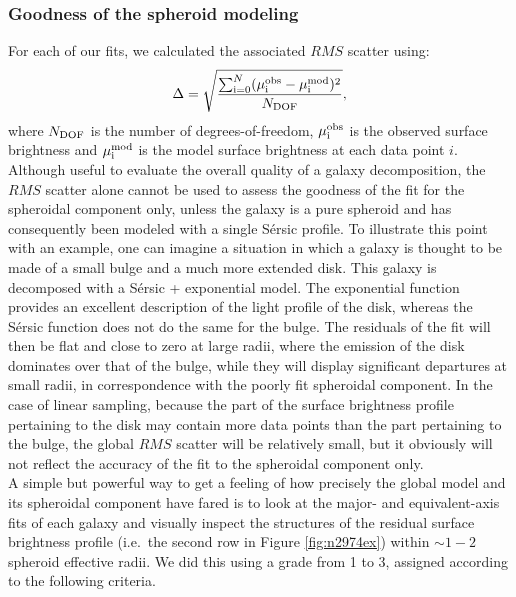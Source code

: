 \documentclass[preprint2]{emulateapj}
\begin{document}
\subsubsection{Goodness of the spheroid modeling}
For each of our fits, we calculated the associated $RMS$ scatter using:
\begin{equation}
\Delta = \sqrt{\frac{\sum_{\rm i=0}^{N} (\mu_{\rm i}^{\rm obs} - \mu_{\rm i}^{\rm mod})^2}{N_{\rm DOF}} } ,
\end{equation} 
where $N_{\rm DOF}$ is the number of degrees-of-freedom, 
$\mu_{\rm i}^{\rm obs}$ is the observed surface brightness 
and $\mu_{\rm i}^{\rm mod}$ is the model surface brightness at each data point $i$.
Although useful to evaluate the overall quality of a galaxy decomposition, 
the $RMS$ scatter alone cannot be used to assess the goodness of the fit for the spheroidal component only, 
unless the galaxy is a pure spheroid and has consequently been modeled with a single S\'ersic profile.
To illustrate this point with an example, 
one can imagine a situation in which a galaxy is thought to be made of a small bulge and a much more extended disk.
This galaxy is decomposed with a S\'ersic + exponential model.
The exponential function provides an excellent description of the light profile of the disk, 
whereas the S\'ersic function does not do the same for the bulge.
The residuals of the fit will then be flat and close to zero at large radii, 
where the emission of the disk dominates over that of the bulge,
while they will display significant departures at small radii, 
in correspondence with the poorly fit spheroidal component.
In the case of linear sampling, 
because the part of the surface brightness profile pertaining to the disk may contain more data points 
than the part pertaining to the bulge, 
the global $RMS$ scatter will be relatively small, 
but it obviously will not reflect the accuracy of the fit to the spheroidal component only. \\
A simple but powerful way to get a feeling of how precisely the global model and its spheroidal component have fared
is to look at the major- and equivalent-axis fits of each galaxy 
and visually inspect the structures of the residual surface brightness profile 
(i.e.~the second row in Figure \ref{fig:n2974ex}) within $\sim 1 - 2$ spheroid effective radii. 
We did this using a grade from 1 to 3, assigned according to the following criteria.
\end{document}
